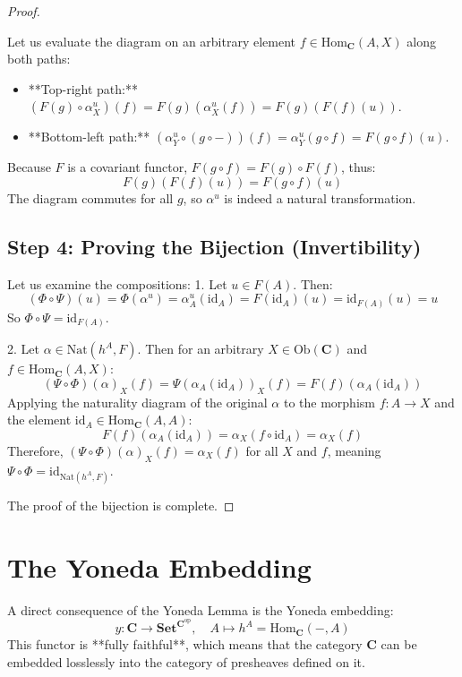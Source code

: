 \documentclass[11pt,a4paper,oneside]{book}
\theoremstyle{definition}
\theoremstyle{plain}
\newcommand{\Cat}[1]{\mathbf{#1}}
\newcommand{\Hom}{\text{Hom}}
\newcommand{\id}{\text{id}}
\newcommand{\Nat}{\text{Nat}}
\begin{document}
\begin{proof}
\begin{center}
\end{center}

Let us evaluate the diagram on an arbitrary element $f \in \Hom_{\Cat{C}}(A, X)$ along both paths:
\begin{itemize}
    \item **Top-right path:** $(F(g) \circ \alpha^u_X)(f) = F(g)(\alpha^u_X(f)) = F(g)(F(f)(u))$.
    \item **Bottom-left path:** $(\alpha^u_Y \circ (g \circ -))(f) = \alpha^u_Y(g \circ f) = F(g \circ f)(u)$.
\end{itemize}
Because $F$ is a covariant functor, $F(g \circ f) = F(g) \circ F(f)$, thus:
\[ F(g)(F(f)(u)) = F(g \circ f)(u) \]
The diagram commutes for all $g$, so $\alpha^u$ is indeed a natural transformation.

\subsection*{Step 4: Proving the Bijection (Invertibility)}
Let us examine the compositions:
1. Let $u \in F(A)$. Then:
   \[ (\Phi \circ \Psi)(u) = \Phi(\alpha^u) = \alpha^u_A(\id_A) = F(\id_A)(u) = \id_{F(A)}(u) = u \]
   So $\Phi \circ \Psi = \id_{F(A)}$.

2. Let $\alpha \in \Nat(h^A, F)$. Then for an arbitrary $X \in \text{Ob}(\Cat{C})$ and $f \in \Hom_{\Cat{C}}(A, X)$:
   \[ (\Psi \circ \Phi)(\alpha)_X(f) = \Psi(\alpha_A(\id_A))_X(f) = F(f)(\alpha_A(\id_A)) \]
   Applying the naturality diagram of the original $\alpha$ to the morphism $f: A \to X$ and the element $\id_A \in \Hom_{\Cat{C}}(A, A)$:
   \[ F(f)(\alpha_A(\id_A)) = \alpha_X(f \circ \id_A) = \alpha_X(f) \]
   Therefore, $(\Psi \circ \Phi)(\alpha)_X(f) = \alpha_X(f)$ for all $X$ and $f$, meaning $\Psi \circ \Phi = \id_{\Nat(h^A, F)}$.

The proof of the bijection is complete.
\end{proof}

\section{The Yoneda Embedding}
A direct consequence of the Yoneda Lemma is the Yoneda embedding:
\[ y: \Cat{C} \to \Cat{Set}^{\Cat{C}^{\text{op}}}, \quad A \mapsto h^A = \Hom_{\Cat{C}}(-, A) \]
This functor is **fully faithful**, which means that the category $\Cat{C}$ can be embedded losslessly into the category of presheaves defined on it.
\end{document}
